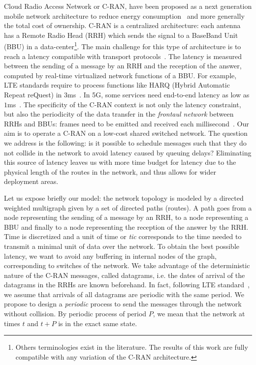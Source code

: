 \documentclass[a4paper,10pt]{article}
\begin{document}
Cloud Radio Access Network or C-RAN, have been proposed as a next generation mobile network architecture to reduce energy consumption~\cite{mobile2011c} and more generally the total cost of ownership.
C-RAN is a centralized architecture: each antenna has a Remote Radio Head (RRH) which sends the signal to
a BaseBand Unit (BBU) in a data-center\footnote{Others terminologies exist in the literature. The results of this work are fully compatible with any variation of the C-RAN architecture.}.
The main challenge for this type of architecture is to reach a latency compatible with transport protocols~\cite{ieeep802}. The latency is measured between the sending of a message by an RRH and the reception of the answer, computed by real-time virtualized network functions of a BBU. For example, LTE standards require to process functions like HARQ (Hybrid Automatic Repeat reQuest) in $3$ms~\cite{bouguen2012lte}. In 5G, some services need end-to-end latency as low as $1$ms~\cite{3gpp5g,boccardi2014five}. The specificity of the C-RAN context is not only the latency constraint, but also the periodicity of the data transfer in the \emph{frontaul network} between RRHs and BBUs: frames need to be emitted and received each millisecond~\cite{bouguen2012lte}.
Our aim is to operate a C-RAN on a low-cost shared switched network.
The question we address is the following: is it possible to schedule messages such that they do not collide in the network to avoid latency caused by queuing delays? Eliminating this source of latency leaves us with more time budget for latency due to the physical length of the routes in the network, and thus allows for wider deployment areas.

Let us expose briefly our model: the network topology is modeled by a directed weighted multigraph given by a set of directed paths (routes). A path goes from a node representing the sending of a message by an RRH, to a node representing a BBU and finally to a node representing the reception of the answer by the RRH. Time is discretized and a unit of time or \emph{tic} corresponds to the time needed to transmit a minimal unit of data over the network. To obtain the best possible latency, we want to avoid any buffering in internal nodes of the graph, corresponding to switches of the network. We take advantage of the deterministic nature of the C-RAN messages, called datagrams, i.e. the dates of arrival of the datagrams in the RRHs are known beforehand. In fact, following LTE standard~\cite{bouguen2012lte}, we assume that arrivals of all datagrams are periodic with the same period. We propose to design a \emph{periodic} process to send the messages through the network without collision. By periodic process of period $P$, we mean that the network at times $t$ and $t+P$ is in the exact same state. 
\end{document}
